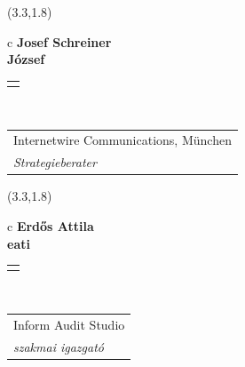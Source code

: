 \documentclass[11pt]{article}
\begin{document}
\makebox(3.3,1.8){
  \renewcommand\arraystretch{1.3}
  \begin{tabular}[c]{c}
    \hspace{8.5mm}
    \LARGE\bf{ Josef Schreiner }\\
    \hspace{8.5mm}
    \Large{ József }\\
    \renewcommand\arraystretch{3}
    \begin{tabular}[c]{c}
      \centering
      \fontfamily{phv}\selectfont{
        \textbf{
          \textsc{
            \scriptsize{
            \color{Dark}{ Ismerkedő }\color{Dark}{ Webmester }\color{Bright}{ Sminkmester }\color{Dark}{ Programozó }
            }
          }
        }
      }
    \end{tabular}
    \\
    \renewcommand\arraystretch{1}
    \begin{tabular}{p{3.3in}}
      \hspace{.7cm}Internetwire Communications, München\\
      \hspace{.7cm}\emph{ Strategieberater }\\
    \end{tabular}
  \end{tabular}
}

\makebox(3.3,1.8){
  \renewcommand\arraystretch{1.3}
  \begin{tabular}[c]{c}
    \hspace{8.5mm}
    \LARGE\bf{ Erdős Attila }\\
    \hspace{8.5mm}
    \Large{ eati }\\
    \renewcommand\arraystretch{3}
    \begin{tabular}[c]{c}
      \centering
      \fontfamily{phv}\selectfont{
        \textbf{
          \textsc{
            \scriptsize{
            \color{Dark}{ Ismerkedő }\color{Dark}{ Webmester }\color{Bright}{ Sminkmester }\color{Dark}{ Programozó }
            }
          }
        }
      }
    \end{tabular}
    \\
    \renewcommand\arraystretch{1}
    \begin{tabular}{p{3.3in}}
      \hspace{.7cm}Inform Audit Studio\\
      \hspace{.7cm}\emph{ szakmai igazgató }\\
    \end{tabular}
  \end{tabular}
}
\end{document}
